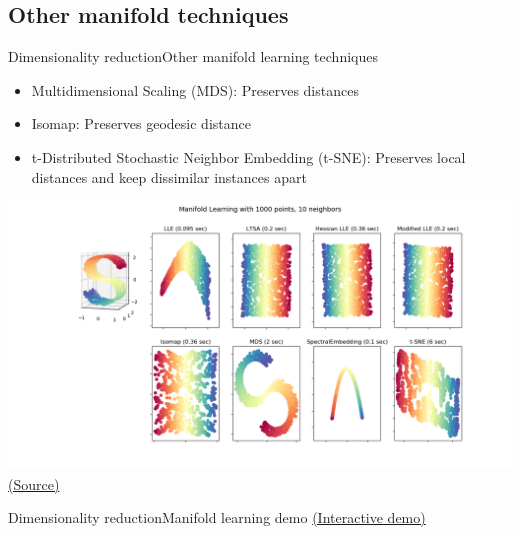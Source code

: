 \documentclass[10pt,compress]{beamer} %
\begin{document}
\subsection{Other manifold techniques}
\begin{frame}[plain]{Dimensionality reduction}{Other manifold learning techniques}
    \begin{itemize}
	    \item Multidimensional Scaling (MDS): Preserves distances
        \item Isomap: Preserves geodesic distance 
        \item t-Distributed Stochastic Neighbor Embedding (t-SNE):
            Preserves local distances and keep dissimilar instances apart
    \end{itemize}
        
    \centering
	\includegraphics[width=\linewidth]{figs/manifold.png}\\
   	\tiny{\href{https://scikit-learn.org/0.21/auto_examples/manifold/plot_compare_methods.html}{(Source)}}
\end{frame}

\begin{frame}{Dimensionality reduction}{Manifold learning demo}
\href{http://projector.tensorflow.org/}{(Interactive demo)}
\end{frame}
\end{document}
